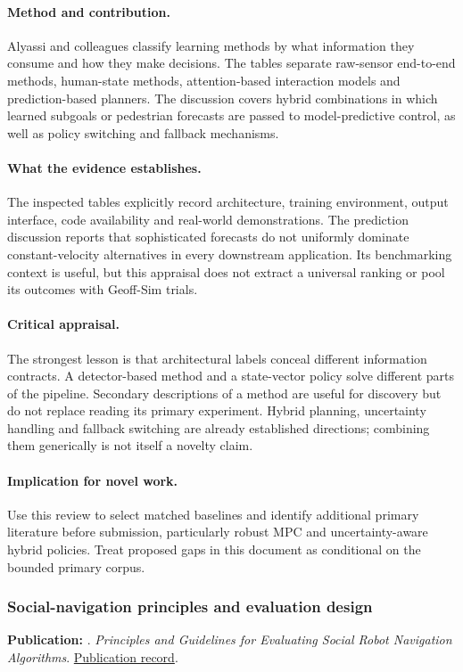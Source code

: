 \paragraph{Method and contribution.} Alyassi and colleagues classify learning methods by what information they consume and how they make decisions. The tables separate raw-sensor end-to-end methods, human-state methods, attention-based interaction models and prediction-based planners. The discussion covers hybrid combinations in which learned subgoals or pedestrian forecasts are passed to model-predictive control, as well as policy switching and fallback mechanisms.

\paragraph{What the evidence establishes.} The inspected tables explicitly record architecture, training environment, output interface, code availability and real-world demonstrations. The prediction discussion reports that sophisticated forecasts do not uniformly dominate constant-velocity alternatives in every downstream application. Its benchmarking context is useful, but this appraisal does not extract a universal ranking or pool its outcomes with Geoff-Sim trials.

\paragraph{Critical appraisal.} The strongest lesson is that architectural labels conceal different information contracts. A detector-based method and a state-vector policy solve different parts of the pipeline. Secondary descriptions of a method are useful for discovery but do not replace reading its primary experiment. Hybrid planning, uncertainty handling and fallback switching are already established directions; combining them generically is not itself a novelty claim.

\paragraph{Implication for novel work.} Use this review to select matched baselines and identify additional primary literature before submission, particularly robust MPC and uncertainty-aware hybrid policies. Treat proposed gaps in this document as conditional on the bounded primary corpus.

\subsubsection{Social-navigation principles and evaluation design}\label{paper:guidelines}
\textbf{Publication:} \citet{guidelines}. \emph{Principles and Guidelines for Evaluating Social Robot Navigation Algorithms}. \href{https://doi.org/10.1145/3700599}{Publication record}.


